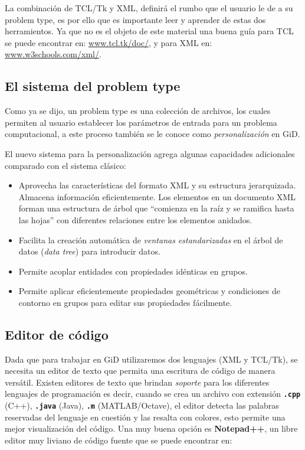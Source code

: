 \documentclass[10pt, a4paper, twocolumn]{article} %
\begin{document}
La combinación de TCL/Tk y XML, definirá el rumbo que el usuario le de a su problem type, es por ello que es importante leer y aprender de estas dos herramientos. Ya que no es el objeto de este material una buena guía para TCL se puede encontrar en: \textcolor{BlueGiD}{\underline{\url{www.tcl.tk/doc/}}}, y para XML en: \textcolor{BlueGiD}{\underline{\url{www.w3schools.com/xml/}}}.

\subsection{El sistema del problem type}

Como ya se dijo, un problem type es una colección de archivos, los cuales permiten al usuario establecer los parámetros de entrada para un problema computacional, a este proceso también se le conoce como \textit{personalización} en GiD. 

El nuevo sistema para la personalización agrega algunas capacidades adicionales comparado con el sistema clásico:

\begin{itemize}
	\item Aprovecha las características del formato XML y su estructura jerarquizada. Almacena información eficientemente. Los elementos en un documento XML forman una estructura de árbol que ``comienza en la raíz y se ramifica hasta las hojas'' con diferentes relaciones entre los elementos anidados.
	\item Facilita la creación automática de \textit{ventanas estandarizadas} en el árbol de datos (\textit{data tree}) para introducir datos.
	\item Permite acoplar entidades con propiedades idénticas en grupos.
	\item Permite aplicar eficientemente propiedades geométricas y condiciones de contorno en grupos para editar sus propiedades fácilmente.
\end{itemize}

\subsection{Editor de código}

Dada que para trabajar en GiD utilizaremos dos lenguajes (XML y TCL/Tk), se necesita un editor de texto que permita una escritura de código de manera versátil. Existen editores de texto que brindan \textit{soporte} para los diferentes lenguajes de programación es decir, cuando se crea un archivo con extensión \textbf{\texttt{.cpp}} (C++), \textbf{\texttt{.java}} (Java), \textbf{\texttt{.m}} (MATLAB/Octave), el editor detecta las palabras reservadas del lenguaje en cuestión y las resalta con colores, esto permite una mejor visualización del código. Una muy buena opción es \textbf{Notepad++}, un libre editor muy liviano de código fuente que se puede encontrar en:\\ 
\end{document}
